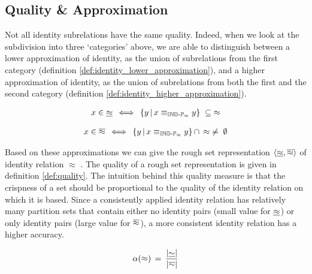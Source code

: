 \subsection{Quality \& Approximation}
\label{sec:approximation}

Not all identity subrelations have the same quality.
Indeed, when we look at the subdivision into three `categories' above,
  we are able to distinguish between a lower approximation of identity,
  as the union of subrelations from the first category
  (definition \ref{def:identity_lower_approximation}),
  and a higher approximation of identity,
  as the union of subrelations from both the first and the second category
  (definition \ref{def:identity_higher_approximation}).

\begin{definition}
\label{def:identity_lower_approximation}
\begin{align}
  x \in \underline{\approx}
\, \iff \,
    \{y\,\vert\,x \equiv_{\operatorname{{\mathbb{IND}-\mathbb{P}}}_{\approx}} y\}
  \; \subseteq \;
    \approx\nonumber
\end{align}
\end{definition}

\begin{definition}
\label{def:identity_higher_approximation}
\begin{align}
  x \in \overline{\approx}
\, \iff \,
      \{y\,\vert\,x \equiv_{\operatorname{{\mathbb{IND}-\mathbb{P}}}_{\approx}} y\}
    \, \cap \,
      \approx
  \; \neq \;
    \emptyset\nonumber
\end{align}
\end{definition}

\noindent Based on these approximations we can give
  the rough set representation $\langle\underline{\approx},\overline{\approx}\rangle$
  of identity relation $\approx$ \cite{Pawlak1991}.
The quality of a rough set representation is given in
  definition \ref{def:quality}.
The intuition behind this quality measure is that the crispness
  of a set should be proportional to the quality
  of the identity relation on which it is based.
Since a consistently applied identity relation has relatively many
  partition sets that contain either
  no identity pairs (small value for $\underline{\approx}$) or
  only identity pairs (large value for $\overline{\approx}$),
  a more consistent identity relation has a higher accuracy.

\begin{definition}[Quality]
\label{def:quality}
\begin{align}
  \alpha(\approx)
\, = \,
  \dfrac{
    \lvert\underline{\sim}\rvert
  }{
    \lvert\overline{\sim}\rvert
  }\nonumber
\end{align}
\end{definition}

